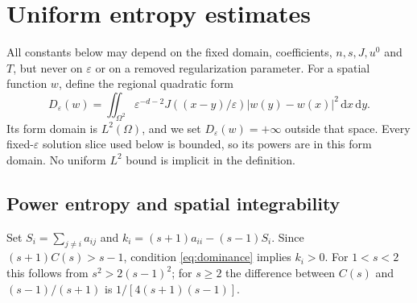 \documentclass[11pt]{article}
\newcommand{\eps}{\varepsilon}
\newcommand{\dd}{\,\mathrm d}
\newcommand{\Om}{\Omega}
\newcommand{\De}{D_\eps}
\begin{document}
\section{Uniform entropy estimates}\label{sec:entropy}

All constants below may depend on the fixed domain, coefficients, $n,s,J,u^0$
and $T$, but never on $\eps$ or on a removed regularization parameter.
For a spatial function $w$, define the regional quadratic form
\begin{equation}\label{eq:D}
 \De(w)=\iint_{\Om^2}\eps^{-d-2}J((x-y)/\eps)
                    |w(y)-w(x)|^2\dd x\dd y.
\end{equation}
Its form domain is $L^2(\Om)$, and we set $\De(w)=+\infty$ outside that
space. Every fixed-$\eps$ solution slice used below is bounded, so its powers
are in this form domain. No uniform $L^2$ bound is implicit in the definition.

\subsection{Power entropy and spatial integrability}

Set $S_i=\sum_{j\ne i}a_{ij}$ and $k_i=(s+1)a_{ii}-(s-1)S_i$.
Since $(s+1)C(s)>s-1$, condition \eqref{eq:dominance} implies $k_i>0$.
For $1<s<2$ this follows from $s^2>2(s-1)^2$; for $s\geq2$ the difference
between $C(s)$ and $(s-1)/(s+1)$ is $1/[4(s+1)(s-1)]$.
\end{document}
